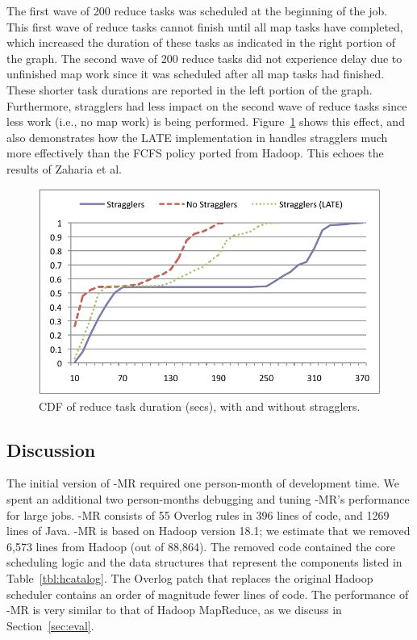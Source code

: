 The first wave of 200 reduce tasks was scheduled at the beginning of the
job. This first wave of reduce tasks cannot finish until all map tasks have
completed, which increased the duration of these tasks as indicated in the right
portion of the graph. The second wave of 200 reduce tasks did not experience
delay due to unfinished map work since it was scheduled after all map tasks had
finished. These shorter task durations are reported in the left portion of the
graph. Furthermore, stragglers had less impact on the second wave of reduce
tasks since less work (i.e., no map work) is being
performed. Figure~\ref{fig:ec2reduce} shows this effect, and also demonstrates
how the LATE implementation in {\BOOMA} handles stragglers much more effectively
than the FCFS policy ported from Hadoop.  This echoes the results of Zaharia et
al.~\cite{late-sched}

\begin{figure}
  \centering
  \includegraphics{figures/reduce_stragglers}
  \caption{CDF of reduce task duration (secs), with and without stragglers.}
  \label{fig:ec2reduce}
\end{figure}

\subsection{Discussion}
The initial version of \BOOM-MR required one person-month of
development time. We spent an additional two person-months debugging
and tuning \BOOM-MR's performance for large jobs. \BOOM-MR consists of
55 Overlog rules in 396 lines of code, and 1269 lines of Java.
\BOOM-MR is based on Hadoop version 18.1; we estimate that we removed
6,573 lines from Hadoop (out of 88,864). The removed code contained
the core scheduling logic and the data structures that represent the
components listed in Table~\ref{tbl:hcatalog}. The Overlog patch that
replaces the original Hadoop scheduler contains an order of magnitude
fewer lines of code.  The performance of \BOOM-MR is very similar to
that of Hadoop MapReduce, as we discuss in Section~\ref{sec:eval}.

